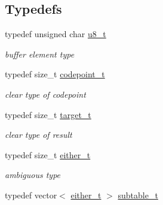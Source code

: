 \subsection*{Typedefs}
\begin{DoxyCompactItemize}
\item 
\hypertarget{namespacejlettvin_a4353bc2d0fd0c93be11f896748588178}{}typedef unsigned char \hyperlink{namespacejlettvin_a4353bc2d0fd0c93be11f896748588178}{u8\+\_\+t}\label{namespacejlettvin_a4353bc2d0fd0c93be11f896748588178}

\begin{DoxyCompactList}\small\item\em buffer element type \end{DoxyCompactList}\item 
\hypertarget{namespacejlettvin_a5c480560edc7a71c9f5ae6dad14e6fec}{}typedef size\+\_\+t \hyperlink{namespacejlettvin_a5c480560edc7a71c9f5ae6dad14e6fec}{codepoint\+\_\+t}\label{namespacejlettvin_a5c480560edc7a71c9f5ae6dad14e6fec}

\begin{DoxyCompactList}\small\item\em clear type of codepoint \end{DoxyCompactList}\item 
\hypertarget{namespacejlettvin_ac925326f2732a65f4e3caaea182401a9}{}typedef size\+\_\+t \hyperlink{namespacejlettvin_ac925326f2732a65f4e3caaea182401a9}{target\+\_\+t}\label{namespacejlettvin_ac925326f2732a65f4e3caaea182401a9}

\begin{DoxyCompactList}\small\item\em clear type of result \end{DoxyCompactList}\item 
\hypertarget{namespacejlettvin_af3d2e8320ecb86b316e2069e9de6e8f2}{}typedef size\+\_\+t \hyperlink{namespacejlettvin_af3d2e8320ecb86b316e2069e9de6e8f2}{either\+\_\+t}\label{namespacejlettvin_af3d2e8320ecb86b316e2069e9de6e8f2}

\begin{DoxyCompactList}\small\item\em ambiguous type \end{DoxyCompactList}\item 
\hypertarget{namespacejlettvin_a7133ba660d288e5f368d7285843739c8}{}typedef vector$<$ \hyperlink{namespacejlettvin_af3d2e8320ecb86b316e2069e9de6e8f2}{either\+\_\+t} $>$ \hyperlink{namespacejlettvin_a7133ba660d288e5f368d7285843739c8}{subtable\+\_\+t}\label{namespacejlettvin_a7133ba660d288e5f368d7285843739c8}


\end{DoxyCompactItemize}

